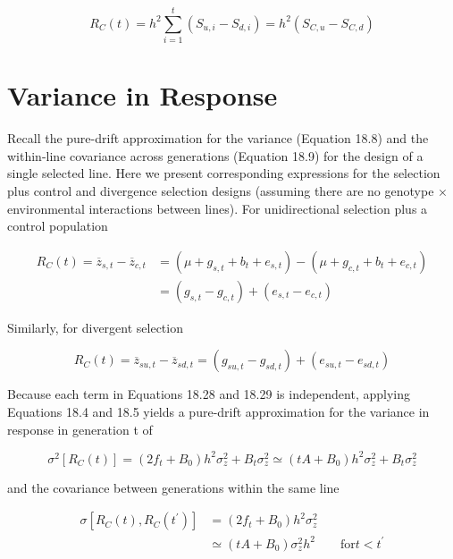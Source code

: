 \documentclass{article}
\begin{document}
\begin{equation}
R_{C}(t)=h^{2}\sum_{i=1}^{t}\left(S_{u,i}-S_{d,i}\right)=h^{2}\left(S_{C,u}-S_{C,d}\right)
\tag{18.27d}
\label{eq:18_27d}
\end{equation}

\section{Variance in Response}
Recall the pure-drift approximation for the variance (Equation 18.8) and the within-line covariance across generations (Equation 18.9) for the design of a single selected line. Here we present corresponding expressions for the selection plus control and divergence selection designs (assuming there are no genotype × environmental interactions between lines). For unidirectional selection plus a control population

\begin{equation}
\begin{aligned}R_{C}(t)=\overline{z}_{s,t}-\overline{z}_{c,t}&=\left(\mu+g_{s,t}+b_{t}+e_{s,t}\right)-\left(\mu+g_{c,t}+b_{t}+e_{c,t}\right)\\&=\left(g_{s,t}-g_{c,t}\right)+\left(e_{s,t}-e_{c,t}\right)\end{aligned}
\tag{18.28}
\label{eq:18_28}
\end{equation}

Similarly, for divergent selection

\begin{equation}
R_{C}(t)=\overline{z}_{s u,t}-\overline{z}_{s d,t}=\left(g_{s u,t}-g_{s d,t}\right)+\left(e_{s u,t}-e_{s d,t}\right)
\tag{18.29}
\label{eq:18_29}
\end{equation}

Because each term in Equations 18.28 and 18.29 is independent, applying Equations 18.4 and 18.5 yields a pure-drift approximation for the variance in response in generation t of

\begin{equation}
\sigma^{2}\left[R_{C}(t)\right]=\left(2f_{t}+B_{0}\right)h^{2}\sigma_{z}^{2}+B_{t}\sigma_{z}^{2}\simeq\left(t A+B_{0}\right)h^{2}\sigma_{z}^{2}+B_{t}\sigma_{z}^{2}
\tag{18.30a}
\label{eq:18_30a}
\end{equation}

and the covariance between generations within the same line

\begin{equation}
\begin{aligned}\sigma\left[R_{C}(t),R_{C}(t^{\prime})\right]&=\left(2f_{t}+B_{0}\right)h^{2}\sigma_{z}^{2}\\&\simeq\left(t A+B_{0}\right)\sigma_{z}^{2}h^{2}\qquad\text{for}t<t^{\prime}\end{aligned}
\tag{18.30b}
\label{eq:18_30b}
\end{equation}
\end{document}

